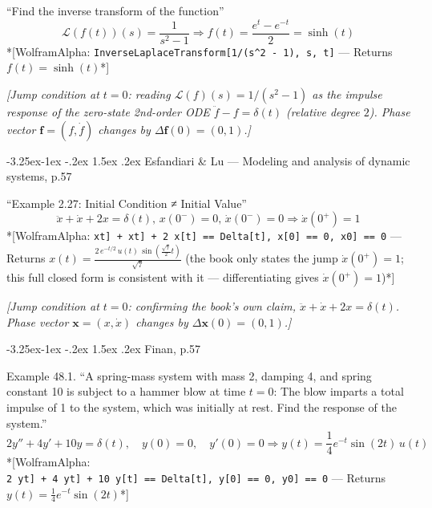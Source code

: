 \documentclass[
  11pt,
]{article}
\makeatletter
\providecommand{\implies}{\Longrightarrow}
\renewcommand\paragraph{\@startsection{paragraph}{4}{\z@}%
                                     {-3.25ex\@plus -1ex \@minus -.2ex}%
                                     {1.5ex \@plus .2ex}%
                                     {\normalfont\normalsize\bfseries}}
\makeatother
\begin{document}
``Find the inverse transform of the function'' \[
\mathcal{L}(f(t))(s) = \frac{1}{s^2 - 1} \implies f(t) = \frac{e^t - e^{-t}}{2} = \sinh(t)
\] *{[}WolframAlpha:
\texttt{InverseLaplaceTransform{[}1/(s\^{}2\ -\ 1),\ s,\ t{]}} ---
Returns \(f(t) = \sinh(t)\)*{]}

\emph{{[}Jump condition at \(t=0\): reading
\(\mathcal{L}(f)(s)=1/(s^2-1)\) as the impulse response of the
zero-state 2nd-order ODE \(\ddot f - f = \delta(t)\) (relative degree
\(2\)). Phase vector \(\mathbf f=(f,\dot f)\) changes by
\(\Delta\mathbf f(0)=(0,1)\).{]}}

\hypertarget{esfandiari-lu-modeling-and-analysis-of-dynamic-systems-p.57}{%
\paragraph{Esfandiari \& Lu --- Modeling and analysis of dynamic
systems,
p.57}\label{esfandiari-lu-modeling-and-analysis-of-dynamic-systems-p.57}}

``Example 2.27: Initial Condition ≠ Initial Value'' \[
 \ddot{x} + \dot{x} + 2x = \delta(t), \, x(0^-) = 0, \, \dot{x}(0^-) = 0
\implies \dot{x}(0^+) =  1
\] *{[}WolframAlpha:
\texttt{x\textquotesingle{}\textquotesingle{}{[}t{]}\ +\ x\textquotesingle{}{[}t{]}\ +\ 2\ x{[}t{]}\ ==\ Delta{[}t{]},\ x{[}0{]}\ ==\ 0,\ x\textquotesingle{}{[}0{]}\ ==\ 0}
--- Returns
\(x(t) = \frac{2 \, e^{-t/2} \, u(t) \, \sin\left(\frac{\sqrt{7}}{2} t\right)}{\sqrt{7}}\)
(the book only states the jump \(\dot x(0^+)=1\); this full closed form
is consistent with it --- differentiating gives \(\dot x(0^+)=1\))*{]}

\emph{{[}Jump condition at \(t=0\): confirming the book's own claim,
\(\ddot x+\dot x+2x=\delta(t)\). Phase vector \(\mathbf x=(x,\dot x)\)
changes by \(\Delta\mathbf x(0)=(0,1)\).{]}}

\hypertarget{finan-p.57}{%
\paragraph{Finan, p.57}\label{finan-p.57}}

Example 48.1. ``A spring-mass system with mass 2, damping 4, and spring
constant 10 is subject to a hammer blow at time \(t = 0\): The blow
imparts a total impulse of 1 to the system, which was initially at rest.
Find the response of the system.'' \[
2y'' + 4y' + 10y = \delta(t), \quad y(0) = 0, \quad y'(0) = 0 \implies y(t) = \frac{1}{4} e^{-t} \sin(2t) \, u(t)
\] *{[}WolframAlpha:
\texttt{2\ y\textquotesingle{}\textquotesingle{}{[}t{]}\ +\ 4\ y\textquotesingle{}{[}t{]}\ +\ 10\ y{[}t{]}\ ==\ Delta{[}t{]},\ y{[}0{]}\ ==\ 0,\ y\textquotesingle{}{[}0{]}\ ==\ 0}
--- Returns \(y(t) = \frac{1}{4} e^{-t} \sin(2t)\)*{]}
\end{document}
